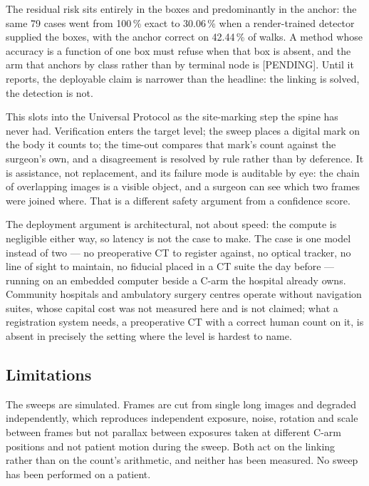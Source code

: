 \documentclass[11pt,letterpaper]{article}
\newcommand{\pc}[1]{#1\,\%}
\begin{document}
The residual risk sits entirely in the boxes and predominantly in the anchor: the same 79 cases went from
\pc{100} exact to \pc{30.06} when a render-trained detector supplied the boxes, with the anchor correct on
\pc{42.44} of walks. A method whose accuracy is a function of one box must refuse when that box is absent,
and the arm that anchors by class rather than by terminal node is [PENDING]. Until it reports, the
deployable claim is narrower than the headline: the linking is solved, the detection is not.

This slots into the Universal Protocol as the site-marking step the spine has never had. Verification
enters the target level; the sweep places a digital mark on the body it counts to; the time-out compares
that mark's count against the surgeon's own, and a disagreement is resolved by rule rather than by
deference. It is assistance, not replacement, and its failure mode is auditable by eye: the chain of
overlapping images is a visible object, and a surgeon can see which two frames were joined where. That is
a different safety argument from a confidence score.

The deployment argument is architectural, not about speed: the compute is negligible either way, so
latency is not the case to make. The case is one model instead of two --- no
preoperative CT to register against, no optical tracker, no line of sight to maintain, no fiducial placed
in a CT suite the day before --- running on an embedded computer beside a C-arm the hospital already owns.
Community hospitals and ambulatory surgery centres operate without navigation suites, whose capital cost
was not measured here and is not claimed; what a registration system needs, a preoperative CT with a
correct human count on it, is absent in precisely the setting where the level is hardest to name.

\subsection*{Limitations}

The sweeps are simulated. Frames are cut from single long images and degraded independently, which
reproduces independent exposure, noise, rotation and scale between frames but not parallax between
exposures taken at different C-arm positions and not patient motion during the sweep. Both act on the
linking rather than on the count's arithmetic, and neither has been measured. No sweep has been performed on
a patient.
\end{document}
